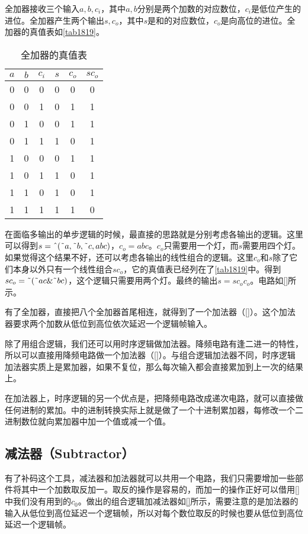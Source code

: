 全加器接收三个输入$a,b,c_i$，其中$a,b$分别是两个加数的对应数位，$c_i$是低位产生的进位。全加器产生两个输出$s,c_o$，其中$s$是和的对应数位，$c_o$是向高位的进位。全加器的真值表如\autoref{tab1819}。

\begin{table}[!h]
\centering
\begin{tabular}{ccc|ccc}
$a$&$b$&$c_i$&$s$&$c_o$&$sc_o$\\\hline
0&0&0&0&0&0\\
0&0&1&0&1&1\\
0&1&0&0&1&1\\
0&1&1&1&0&1\\
1&0&0&0&1&1\\
1&0&1&1&0&1\\
1&1&0&1&0&1\\
1&1&1&1&1&0
\end{tabular}
\caption{全加器的真值表}\label{tab1819}
\end{table}

在面临多输出的单步逻辑的时候，最直接的思路就是分别考虑各输出的逻辑。这里可以得到$s=\textrm{\^{}}(\textrm{\~{}}a,\textrm{\~{}}b,\textrm{\~{}}c,abc)$，$c_o=abc$。$c_o$只需要用一个灯，而$s$需要用四个灯。如果觉得这个结果不好，还可以考虑各输出的线性组合的逻辑。这里$c_o$和$s$除了它们本身以外只有一个线性组合$sc_o$，它的真值表已经列在了\autoref{tab1819}中。得到$sc_o=\textrm{\~{}}(\textrm{\~{}}ac\&\textrm{\~{}}bc)$，这个逻辑只需要用两个灯。最终的输出$s=sc_oc_o$。电路如\autoref{}所示。

有了全加器，直接把八个全加器首尾相连，就得到了一个加法器（\autoref{}）。这个加法器要求两个加数从低位到高位依次延迟一个逻辑帧输入。

除了用组合逻辑，我们还可以用时序逻辑做加法器。降频电路有逢二进一的特性，所以可以直接用降频电路做一个加法器（\autoref{}）。与组合逻辑加法器不同，时序逻辑加法器实质上是累加器，如果不复位，那么每次输入都会直接累加到上一次的结果上。

在加法器上，时序逻辑的另一个优点是，把降频电路改成递次电路，就可以直接做任何进制的累加。\url{}中的进制转换实际上就是做了一个十进制累加器，每修改一个二进制数位就向累加器中加一个值或减一个值。

\subsection{减法器（Subtractor）}
有了补码这个工具，减法器和加法器就可以共用一个电路，我们只需要增加一些部件将其中一个加数取反加一。取反的操作是容易的，而加一的操作正好可以借用\autoref{}中我们没有用到的$c_0$。做出的组合逻辑加减法器如\autoref{}所示，需要注意的是加法器的输入从低位到高位延迟一个逻辑帧，所以对每个数位取反的时候也要从低位到高位延迟一个逻辑帧。

